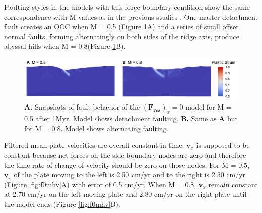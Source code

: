 \documentclass[letterpaper,12pt,notitle]{memphisthesis}                     %
\begin{document}
Faulting styles in the models with this force boundary condition show the same correspondence with M values as in the previous studies \citep{Buck2005,Tucholke2008}. One master detachment fault creates an OCC when M = 0.5 (Figure \ref{fig:f0fault}A) and a series of small offset normal faults, forming alternatingly on both sides of the ridge axis, produce abyssal hills when M = 0.8(Figure \ref{fig:f0fault}B).
%
\begin{figure}[!htb]
	\centering
	\includegraphics[width=0.99\linewidth,trim=8 8 8 8,clip]{./figs/f0fault.png}
	\caption{\textbf{A.} Snapshots of fault behavior of the $(\boldsymbol{F_{res}})_x=0$ model for M = 0.5 after 1Myr. Model shows detachment faulting. \textbf{B.} Same as \textbf{A} but for M = 0.8. Model shows alternating faulting.}
	\label{fig:f0fault}
\end{figure}

Filtered mean plate velocities are overall constant in time. $\overline{\boldsymbol{v}_x}$ is supposed to be constant because net forces on the side boundary nodes are zero and therefore the time rate of change of velocity should be zero on those nodes. For M = 0.5, $\overline{\boldsymbol{v}_x}$ of the plate moving to the left is 2.50 cm/yr and to the right is 2.50 cm/yr (Figure \ref{fig:f0mhv}A) with error of 0.5 cm/yr. When M = 0.8, $\overline{\boldsymbol{v}}_{x}$ remain constant at 2.70 cm/yr on the left-moving plate and 2.80 cm/yr on the right plate until the model ends (Figure \ref{fig:f0mhv}B).
\end{document}

